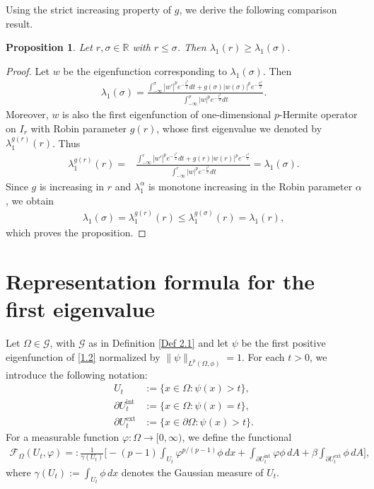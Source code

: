 \documentclass[11pt,leqno]{amsart}
\newtheorem{proposition}{Proposition}[section]
\def\l{\lambda}
\numberwithin{equation}{section}
\begin{document}
Using the strict increasing property of $g$, we derive the following comparison result.
\begin{proposition}\label{pr3.3}
        Let $r,\sigma \in \mathbb{R}$ with $r\leq \sigma$. Then $\lambda_{1}(r)\geq \lambda_{1}(\sigma)$. 
\end{proposition}
\begin{proof}
    Let $w$ be the eigenfunction corresponding to $\lambda_{1}(\sigma)$.    
    Then
\begin{align*}
\lambda_{1}(\sigma)=\frac{\int_{-\infty}^{\sigma}|w'|^{p}e^{-\frac{t^{2}}{2}}dt+g(\sigma)|w(\sigma)|^{p}e^{-\frac{\sigma^{2}}{2}}}{\int_{-\infty}^{\sigma}|w|^{p}e^{-\frac{t^{2}}{2}}dt}.
\end{align*}
Moreover, $w$ is also the first eigenfunction of one-dimensional $p$-Hermite operator on $I_r$ with Robin parameter $g(r)$, whose first eigenvalue we denoted by $\l_1^{g(r)}(r)$. Thus
    \begin{align*}
         \lambda_{1}^{g(r)}(r)=&\frac{\int_{-\infty}^{r}|w'|^{p}e^{-\frac{t^{2}}{2}}dt+g(r)|w(r)|^{p}e^{-\frac{r^{2}}{2}}}{\int_{-\infty}^{r}|w|^{p}e^{-\frac{t^{2}}{2}}dt}=\l_1(\sigma).
    \end{align*}
Since $g$ is increasing in $r$ and  $\l_1^{\alpha}$ is monotone increasing in  the Robin parameter $\alpha$, we obtain
   \begin{align*}
         \lambda_{1}(\sigma)
         = \lambda_{1}^{g(r)}(r)
         \le \lambda_{1}^{g(\sigma)}(r)
         =\lambda_{1}(r),
    \end{align*}
which proves  the proposition.
\end{proof}

\section{Representation formula for the first eigenvalue}\label{sect4}
Let $\Omega \in \mathcal{G}$, with $\mathcal{G}$ as in Definition \ref{Def 2.1} and let $\psi$ be the first positive eigenfunction
of \eqref{1.2} normalized by $\|\psi\|_{L^p(\Omega,\phi )} = 1$. For each $t > 0$, we introduce the following notation:
\begin{align*}
U_t &:= \{x \in \Omega: \psi(x) > t\}, \\
\partial U_t^{\mathrm{int}} &:= \{x \in \Omega: \psi(x) = t\}, \\
\partial U_t^{\mathrm{ext}} &:= \{x \in \partial \Omega: \psi(x) > t\}.
\end{align*}
For a measurable function $\varphi: \Omega \to [0, \infty)$, we define the functional
\begin{align}\label{4.1}
    \mathcal{F}_\Omega(U_t, \varphi) =: \frac{1}{\gamma(U_t)} \Bigg[
- (p-1)\int_{U_t} \varphi^{p/(p-1)} \phi  \, dx
+ \int_{\partial U_t^{\text{int}}} \varphi \phi  \, dA
+ \beta \int_{\partial U_t^{\text{ext}}} \phi  \, dA
\Bigg],
\end{align}
where $\gamma(U_t):=\int_{U_t}\phi\, dx$ denotes the Gaussian measure of $U_t$.
\end{document}
